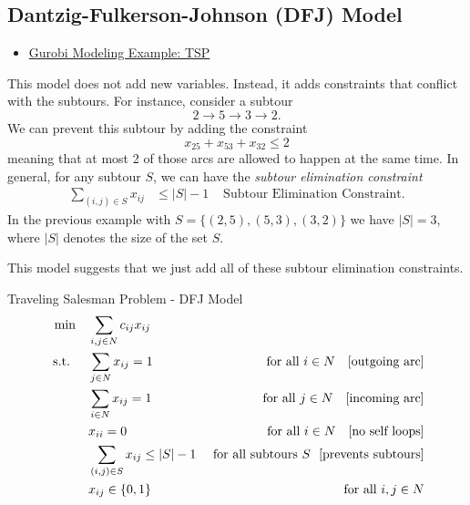 \subsection{Dantzig-Fulkerson-Johnson (DFJ) Model}
\begin{resource}
\begin{itemize}
\item \href{https://github.com/Gurobi/modeling-examples/tree/master/traveling_salesman}{Gurobi Modeling Example: TSP}
\end{itemize}
\end{resource}
This model does not add new variables.  Instead, it adds constraints that conflict with the subtours.  For instance, consider a subtour
\begin{equation}
2 \to 5 \to 3 \to 2.
\end{equation}
We can prevent this subtour by adding the constraint
\begin{equation}
x_{25} + x_{53} + x_{32}  \leq 2
\end{equation}
meaning that at most 2 of those arcs are allowed to happen at the same time.  In general, for any subtour $S$, we can have the \emph{subtour elimination constraint}
\begin{align*}
\sum_{(i,j) \in S} x_{ij} &\leq |S| - 1  & \text{ Subtour Elimination Constraint}.
\end{align*}
In the previous example with $S = \{(2,5), (5,3), (3,2)\}$ we have $|S| = 3$, where $|S|$ denotes the size of the set $S$.

This model suggests that we just add all of these subtour elimination constraints.

\begin{general}{Traveling Salesman Problem - DFJ Model}{}
\begin{align}
\label{eq:tsp-DFJ-model}
\min \quad & \sum_{i,j \in N} c_{ij} x_{ij}\\
\st \quad  & \sum_{j\in N} x_{ij} = 1 & \text{ for all } i \in N \ \ \text{ [outgoing arc]}\\
& \sum_{i \in N} x_{ij} = 1 & \text{ for all } j \in N \ \ \text{ [incoming arc]}\\
& x_{ii} = 0 & \text{ for all } i \in N \ \ \text{ [no self loops]} \\
& \sum_{(i,j) \in S} x_{ij} \leq |S| -1  & \text{ for all subtours } S \ \ \text{[prevents subtours]}\\
& x_{ij} \in \{0,1\} & \text{ for all } i,j \in N
\end{align}
\end{general}

